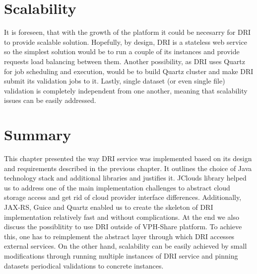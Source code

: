 \section{Scalability} 
It is foreseen, that with the growth of the platform it could be necesarry for DRI to
provide scalable solution. Hopefully, by design, DRI is a stateless web service so the
simplest solution would be to run a couple of its instances and provide requests load
balancing between them. Another possibility, as DRI uses Quartz for job scheduling and
execution, would be to build Quartz cluster and make DRI submit its validation jobs
to it. Lastly, single dataset (or even single file) validation is completely independent
from one another, meaning that scalability issues can be easily addressed.

\section{Summary}
This chapter presented the way DRI service was implemented based on its design and
requirements described in the previous chapter. It outlines the choice of Java technology stack
and additional libraries and justifies it. JClouds library helped us to address one of the
main implementation challenges to abstract cloud storage access and get rid of cloud provider
interface differences. Additionally, JAX-RS, Guice and Quartz enabled us to create the skeleton
of DRI implementation relatively fast and without complications. At the end we also discuss
the possiblitity to use DRI outside of VPH-Share platform. To achieve this, one has to reimplement
the abstract layer through which DRI accesses external services. On the other hand, scalability can
be easily achieved by small modifications through running multiple instances of DRI service and
pinning datasets periodical validations to concrete instances.
